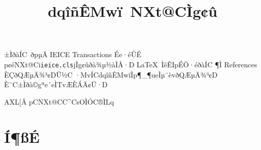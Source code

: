 \documentclass[paper]{ieice}
\title{dqîñÊMwï\LaTeXe\ NXt@CÌg¢û}
\def\ClassFile{\texttt{ieice.cls}}
\begin{document}
\maketitle

\begin{summary}
±ÌðàÍC\LaTeXe\ ðpµÄ IEICE Transactions Ée·éÛÉ
p¢éNXt@Ci\ClassFile{}jÌg¢ûðà¾µ½àÌÅ·D
\LaTeX\ ÌêÊIpÉÖ·éðàÍC
¶Ì References ÈÇðQÆµÄ­¾³¢DÜ½C
·MvÍCdqîñÊMwïÌp¶_¶ueÌµ¨èvðQÆµÄ­¾³¢D
È¨C±Ìðà©gªe´eÌTvÆÈÁÄ¢Ü·D
\end{summary}
\begin{keywords}
AXL[Å p\LaTeXe{}CNXt@CC^CsOÌÓC®ÌLq
\end{keywords}

\section{Í¶ßÉ}\label{intro}
\end{document}
